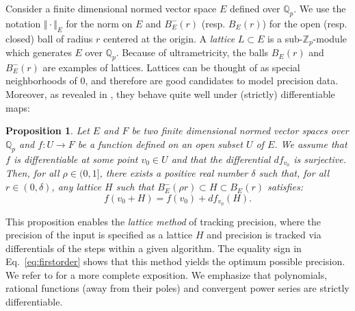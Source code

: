 \documentclass[sigconf]{acmart}
\newcommand{\Z}{\mathbb Z}
\newcommand{\Zp}{\Z_p}
\newcommand{\Q}{\mathbb Q}
\newcommand{\Qp}{\Q_p}
\newtheorem{prop}[theo]{Proposition}
\theoremstyle{definition}
\begin{document}
Consider a finite dimensional normed vector space $E$ defined over 
$\Qp$. We use the notation $\Vert \cdot \Vert_E$ for the norm on $E$ and 
$B^-_E(r)$ (resp. $B^{\phantom -}_E(r)$) for the open (resp. closed) 
ball of radius $r$ centered at the origin. A \emph{lattice} $L \subset 
E$ is a sub-$\Zp$-module which generates $E$ over $\Qp$. Because of 
ultrametricity, the balls $B^{\phantom -}_E(r)$ and $B^-_E(r)$ are 
examples of lattices. Lattices can be thought of as special 
neighborhoods of $0$, and therefore are good candidates to model 
precision data. Moreover, as revealed in \cite{caruso-roe-vaccon:14a}, 
they behave quite well under (strictly) differentiable maps:

\begin{prop}
\label{prop:precision}
Let $E$ and $F$ be two finite dimensional normed vector spaces over $\Qp$ 
and $f : U \rightarrow F$ be a function defined on an open subset $U$ of 
$E$. We assume that $f$ is differentiable at some point $v_0 \in U$ and 
that the differential $df_{v_0}$ is surjective.
Then, for all $\rho \in (0, 1]$, there exists a positive real
number $\delta$ such that, for all $r \in (0, \delta)$, any lattice
$H$ such that $B^-_E(\rho r) \subset H \subset B^{\phantom -}_E(r)$ 
satisfies:
\begin{equation}
\label{eq:firstorder}
f(v_0 + H) = f(v_0) + df_{v_0} (H).
\end{equation}
\end{prop}

This proposition enables the \emph{lattice method} of tracking precision,
where the precision of the input is specified as a lattice $H$ and precision
is tracked via differentials of the steps within a given algorithm.
The equality sign in Eq.~\eqref{eq:firstorder} shows that this method
yields the optimum possible precision. 
We refer to \cite[\S 4.1]{caruso-roe-vaccon:14a} for a more complete 
exposition.
We emphasize that polynomials, rational functions (away from their poles)
and convergent power series are strictly differentiable.

%
\end{document}
